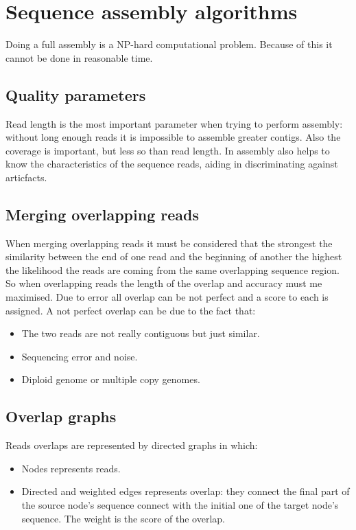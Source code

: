 \section{Sequence assembly algorithms}
Doing a full assembly is a NP-hard computational problem.
Because of this it cannot be done in reasonable time.

    \subsection{Quality parameters}
    Read length is the most important parameter when trying to perform assembly: without long enough reads it is impossible to assemble greater contigs.
    Also the coverage is important, but less so than read length.
    In assembly also helps to know the characteristics of the sequence reads, aiding in discriminating against articfacts.

    \subsection{Merging overlapping reads}
    When merging overlapping reads it must be considered that the strongest the similarity between the end of one read and the beginning of another the highest the likelihood the reads are coming from the same overlapping sequence region.
    So when overlapping reads the length of the overlap and accuracy must me maximised.
    Due to error all overlap can be not perfect and a score to each is assigned.
    A not perfect overlap can be due to the fact that:

    \begin{multicols}{2}
        \begin{itemize}
            \item The two reads are not really contiguous but just similar.
            \item Sequencing error and noise.
            \item Diploid genome or multiple copy genomes.
        \end{itemize}
    \end{multicols}

    \subsection{Overlap graphs}
    Reads overlaps are represented by directed graphs in which:

    \begin{multicols}{2}
        \begin{itemize}
            \item Nodes represents reads.
            \item Directed and weighted edges represents overlap: they connect the final part of the source node's sequence connect with the initial one of the target node's sequence.
                The weight is the score of the overlap.
        \end{itemize}
    \end{multicols}


